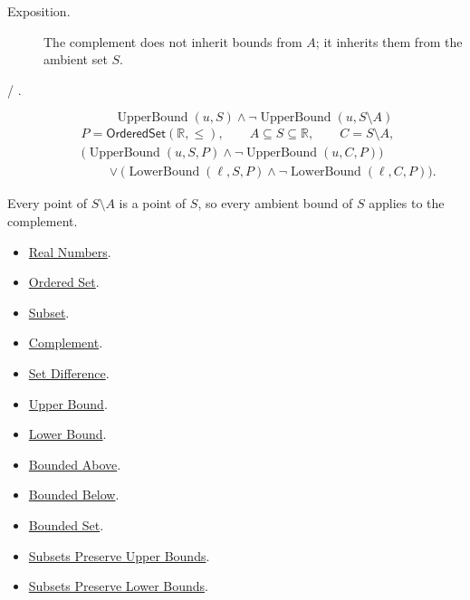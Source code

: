\begin{remark*}
\begin{description}
\item[Exposition.]
The complement does not inherit bounds from $A$; it inherits them from the
ambient set $S$.


  \item[ / .]
  \[
\operatorname{UpperBound}(u,S)\land\neg\operatorname{UpperBound}(u,S\setminus A)
\]
\[
\begin{aligned}
&P=\mathsf{OrderedSet}(\mathbb{R},\leq),\qquad A\subseteq S\subseteq\mathbb{R},\qquad C=S\setminus A,\\
&\bigl(\operatorname{UpperBound}(u,S,P)\land\neg\operatorname{UpperBound}(u,C,P)\bigr)\\
&\qquad{}\lor
\bigl(\operatorname{LowerBound}(\ell,S,P)\land\neg\operatorname{LowerBound}(\ell,C,P)\bigr).
\end{aligned}
\]
\end{description}
\end{remark*}

\begin{remark*}[Interpretation]
Every point of $S\setminus A$ is a point of $S$, so every ambient bound of
$S$ applies to the complement.
\end{remark*}

\begin{dependencies}
\begin{itemize}
\item \hyperref[def:reals]{Real Numbers}.
\item \hyperref[def:ordered-set]{Ordered Set}.
\item \hyperref[def:subset]{Subset}.
\item \hyperref[def:complement]{Complement}.
\item \hyperref[def:set-difference]{Set Difference}.
\item \hyperref[def:real-upper-bound]{Upper Bound}.
\item \hyperref[def:real-lower-bound]{Lower Bound}.
\item \hyperref[def:bounded-above]{Bounded Above}.
\item \hyperref[def:bounded-below]{Bounded Below}.
\item \hyperref[def:bounded]{Bounded Set}.
\item \hyperref[lem:subsets-preserve-upper-bounds]{Subsets Preserve Upper Bounds}.
\item \hyperref[lem:subsets-preserve-lower-bounds]{Subsets Preserve Lower Bounds}.
\end{itemize}
\end{dependencies}
